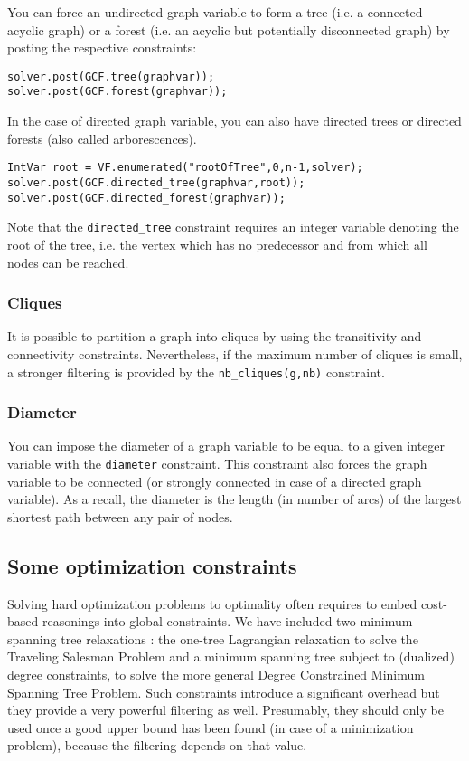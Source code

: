 \documentclass{article}
\begin{document}
You can force an undirected graph variable to form a tree (i.e. a connected acyclic graph) or a forest (i.e. an acyclic but potentially disconnected graph) by posting the respective constraints: 
\begin{lstlisting}
solver.post(GCF.tree(graphvar));
solver.post(GCF.forest(graphvar));
\end{lstlisting}

In the case of directed graph variable, you can also have directed trees or directed forests (also called arborescences). 
\begin{lstlisting}
IntVar root = VF.enumerated("rootOfTree",0,n-1,solver);
solver.post(GCF.directed_tree(graphvar,root));
solver.post(GCF.directed_forest(graphvar));
\end{lstlisting}

Note that the \texttt{directed\_tree} constraint requires an integer variable denoting the root of the tree, i.e. the vertex which has no predecessor and from which all nodes can be reached. 

\subsubsection{Cliques}

It is possible to partition a graph into cliques by using the transitivity and connectivity constraints. Nevertheless, if the maximum number of cliques is small, a stronger filtering is provided by the \texttt{nb\_cliques(g,nb)} constraint. 

\subsubsection{Diameter}

You can impose the diameter of a graph variable to be equal to a given integer variable with the \texttt{diameter} constraint. This constraint also forces the graph variable to be connected (or strongly connected in case of a directed graph variable). As a recall, the diameter is the length (in number of arcs) of the largest shortest path between any pair of nodes. 

\subsection{Some optimization constraints}

Solving hard optimization problems to optimality often requires to embed cost-based reasonings into global constraints. 
We have included two minimum spanning tree relaxations : the one-tree Lagrangian relaxation to solve the Traveling Salesman Problem and a minimum spanning tree subject to (dualized) degree constraints, to solve the more general Degree Constrained Minimum Spanning Tree Problem. Such constraints introduce a significant overhead but they provide a very powerful filtering as well. Presumably, they should only be used once a good upper bound has been found (in case of a minimization problem), because the filtering depends on that value. 
\end{document}
